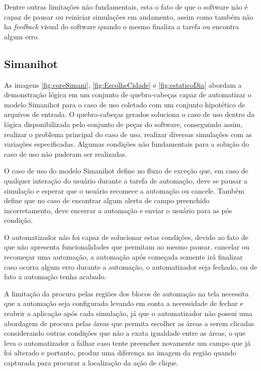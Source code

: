 \documentclass[tg]{mdtufsm}
\begin{document}
                Dentre outras limitações não fundamentais, esta o fato de que o software não é capaz de pausar ou reiniciar simulações em andamento, assim como também não ha \emph{feedback} visual do software quando o mesmo finaliza a tarefa ou encontra algum erro.

                \subsection {Simanihot}

                    As imagens \ref{fig:coreSimani}, \ref{fig:EscolheCidade} e \ref{fig:estaticoDia} abordam a demonstração lógica em um conjunto de quebra-cabeças capaz de automatizar o modelo Simanihot para o caso de uso coletado com um conjunto hipotético de arquivos de entrada. O quebra-cabeças gerados soluciona o caso de uso dentro da lógica disponibilizada pelo conjunto de peças do software, conseguindo assim, realizar o problema principal do caso de uso, realizar diversas simulações com as variações especificadas. Algumas condições não fundamentais para a solução do caso de uso não puderam ser realizadas.

                    O caso de uso do modelo Simanihot define no fluxo de exceção que, em caso de qualquer interação do usuário durante a tarefa de automação, deve se pausar a simulação e esperar que o usuário recomece a automação ou cancele. Também define que no caso de encontrar algum alerta de campo preenchido incorretamento, deve encerrar a automação e enviar o usuário para as pós condição.

                    O automatizador não foi capaz de solucionar estas condições, devido ao fato de que não apresenta funcionalidades que permitam ao mesmo pausar, cancelar ou recomeçar uma automação, a automação após começada somente irá finalizar caso ocorra algum erro durante a automação, o automatizador seja fechado, ou de fato a automação tenha acabado.

                    A limitação da procura pelas regiões dos blocos de automação na tela necessita que a automação seja configurada levando em conta a necessidade de fechar e reabrir a aplicação após cada simulação, já que o automatizador não possui uma abordagem de procura pelas áreas que permita escolher as áreas a serem clicadas considerando outras condições que não a exata igualdade entre as áreas, o que leva o automatizador a falhar caso tente preencher novamente um campo que já foi alterado e portanto, produz uma diferença na imagem da região quando capturada para procurar a localização da ação de clique.
\end{document}
